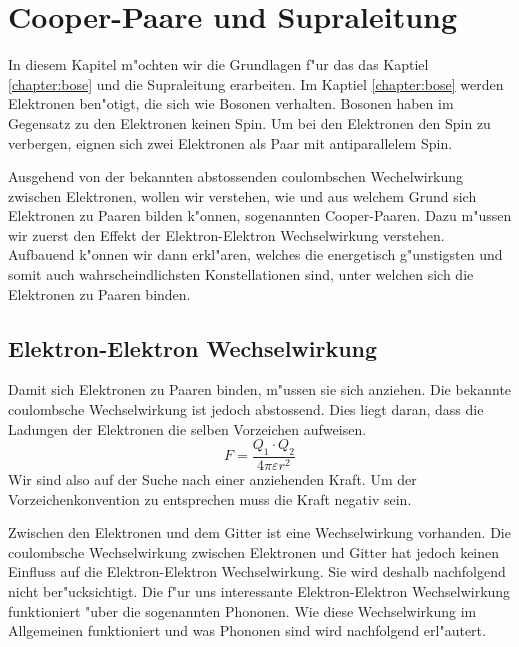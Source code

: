 
\chapter{Cooper-Paare und Supraleitung\label{chapter:supraleitung}}
\begin{refsection}

In diesem Kapitel m"ochten wir die Grundlagen f"ur das das Kaptiel \ref{chapter:bose} und
die Supraleitung erarbeiten. Im Kaptiel \ref{chapter:bose} werden Elektronen ben"otigt,
die sich wie Bosonen verhalten. Bosonen haben im Gegensatz zu den Elektronen
keinen Spin. Um bei den Elektronen den Spin zu verbergen, eignen sich zwei Elektronen als Paar mit
antiparallelem Spin.

Ausgehend von der bekannten abstossenden coulombschen Wechelwirkung zwischen Elektronen,
wollen wir verstehen, wie und aus welchem Grund sich Elektronen zu Paaren bilden k"onnen,
sogenannten Cooper-Paaren.
Dazu m"ussen wir zuerst den Effekt der Elektron-Elektron Wechselwirkung verstehen.
Aufbauend k"onnen wir dann erkl"aren, welches die energetisch g"unstigsten und somit auch
wahrscheindlichsten Konstellationen sind, unter welchen sich die Elektronen zu Paaren binden.

\section{Elektron-Elektron Wechselwirkung\label{supraleitung:elektronelektronwecheslwirkung}}
Damit sich Elektronen zu Paaren binden, m"ussen sie sich anziehen.
Die bekannte coulombsche Wechselwirkung ist jedoch abstossend.
Dies liegt daran, dass die Ladungen der Elektronen die selben Vorzeichen aufweisen.
\begin{equation}
F = \frac{Q_1\cdot Q_2}{4\pi \varepsilon r^2}
\label{supraleitung:Coulomb}
\end{equation}
Wir sind also auf der Suche nach einer anziehenden Kraft.
Um der Vorzeichenkonvention zu entsprechen muss die Kraft negativ sein.

Zwischen den Elektronen und dem Gitter ist eine Wechselwirkung vorhanden.
Die coulombsche Wechselwirkung zwischen Elektronen und Gitter hat jedoch keinen Einfluss auf die
Elektron-Elektron Wechselwirkung.
Sie wird deshalb nachfolgend nicht ber"ucksichtigt.
Die f"ur uns interessante Elektron-Elektron Wechselwirkung funktioniert "uber die sogenannten Phononen.
Wie diese Wechselwirkung im Allgemeinen funktioniert und was Phononen sind wird nachfolgend erl"autert.


\end{refsection}
